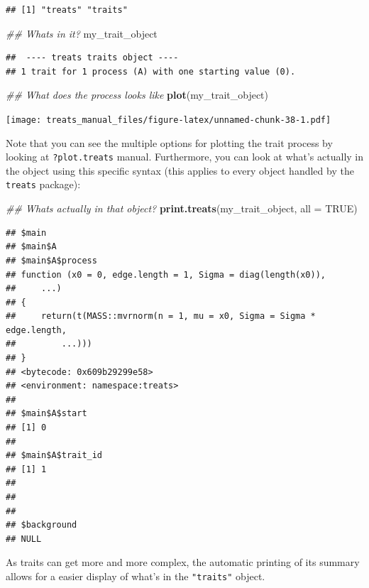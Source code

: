 \documentclass[
]{book}
\newenvironment{Shaded}{\begin{snugshade}}{\end{snugshade}}
\newcommand{\CommentTok}[1]{\textcolor[rgb]{0.56,0.35,0.01}{\textit{#1}}}
\newcommand{\DataTypeTok}[1]{\textcolor[rgb]{0.13,0.29,0.53}{#1}}
\newcommand{\KeywordTok}[1]{\textcolor[rgb]{0.13,0.29,0.53}{\textbf{#1}}}
\newcommand{\NormalTok}[1]{#1}
\newcommand{\OtherTok}[1]{\textcolor[rgb]{0.56,0.35,0.01}{#1}}
\begin{document}
\begin{verbatim}
## [1] "treats" "traits"
\end{verbatim}

\begin{Shaded}
\begin{Highlighting}[]
\CommentTok{\#\# What\textquotesingle{}s in it?}
\NormalTok{my\_trait\_object}
\end{Highlighting}
\end{Shaded}

\begin{verbatim}
##  ---- treats traits object ---- 
## 1 trait for 1 process (A) with one starting value (0).
\end{verbatim}

\begin{Shaded}
\begin{Highlighting}[]
\CommentTok{\#\# What does the process looks like}
\KeywordTok{plot}\NormalTok{(my\_trait\_object)}
\end{Highlighting}
\end{Shaded}

\texttt{[image: treats\_manual\_files/figure-latex/unnamed-chunk-38-1.pdf]}

Note that you can see the multiple options for plotting the trait process by looking at \texttt{?plot.treats} manual. Furthermore, you can look at what's actually in the object using this specific syntax (this applies to every object handled by the \texttt{treats} package):

\begin{Shaded}
\begin{Highlighting}[]
\CommentTok{\#\# What\textquotesingle{}s actually in that object?}
\KeywordTok{print.treats}\NormalTok{(my\_trait\_object, }\DataTypeTok{all =} \OtherTok{TRUE}\NormalTok{)}
\end{Highlighting}
\end{Shaded}

\begin{verbatim}
## $main
## $main$A
## $main$A$process
## function (x0 = 0, edge.length = 1, Sigma = diag(length(x0)), 
##     ...) 
## {
##     return(t(MASS::mvrnorm(n = 1, mu = x0, Sigma = Sigma * edge.length, 
##         ...)))
## }
## <bytecode: 0x609b29299e58>
## <environment: namespace:treats>
## 
## $main$A$start
## [1] 0
## 
## $main$A$trait_id
## [1] 1
## 
## 
## 
## $background
## NULL
\end{verbatim}

As traits can get more and more complex, the automatic printing of its summary allows for a easier display of what's in the \texttt{"traits"} object.
\end{document}

